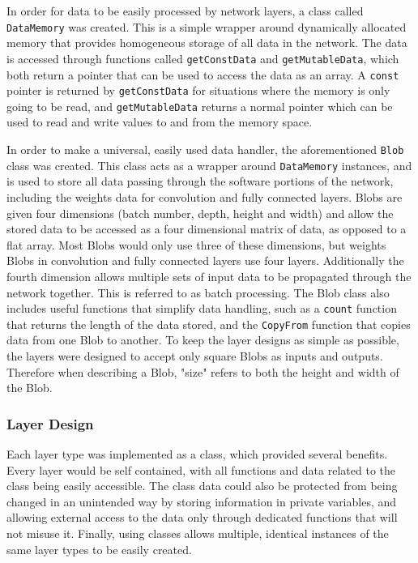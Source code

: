 \documentclass[12pt]{article}
\begin{document}
In order for data to be easily processed by network layers, a class called \lstinline|DataMemory| was created. This is a simple wrapper around dynamically allocated memory that provides homogeneous storage of all data in the network. The data is accessed through functions called \lstinline|getConstData| and \lstinline|getMutableData|, which both return a pointer that can be used to access the data as an array. A \lstinline|const| pointer is returned by \lstinline|getConstData| for situations where the memory is only going to be read, and \lstinline|getMutableData| returns a normal pointer which can be used to read and write values to and from the memory space.

In order to make a universal, easily used data handler, the aforementioned \lstinline|Blob| class was created. This class acts as a wrapper around \lstinline|DataMemory| instances, and is used to store all data passing through the software portions of the network, including the weights data for convolution and fully connected layers. Blobs are given four dimensions (batch number, depth, height and width) and allow the stored data to be accessed as a four dimensional matrix of data, as opposed to a flat array. Most Blobs would only use three of these dimensions, but weights Blobs in convolution and fully connected layers use four layers. Additionally the fourth dimension allows multiple sets of input data to be propagated through the network together. This is referred to as batch processing. The Blob class also includes useful functions that simplify data handling, such as a \lstinline|count| function that returns the length of the data stored, and the \lstinline|CopyFrom| function that copies data from one Blob to another. To keep the layer designs as simple as possible, the layers were designed to accept only square Blobs as inputs and outputs. Therefore when describing a Blob, "size" refers to both the height and width of the Blob.

\subsubsection{Layer Design}
\label{sec:Design-Network-Layers}

Each layer type was implemented as a class, which provided several benefits. Every layer would be self contained, with all functions and data related to the class being easily accessible. The class data could also be protected from being changed in an unintended way by storing information in private variables, and allowing external access to the data only through dedicated functions that will not misuse it. Finally, using classes allows multiple, identical instances of the same layer types to be easily created.
\end{document}
